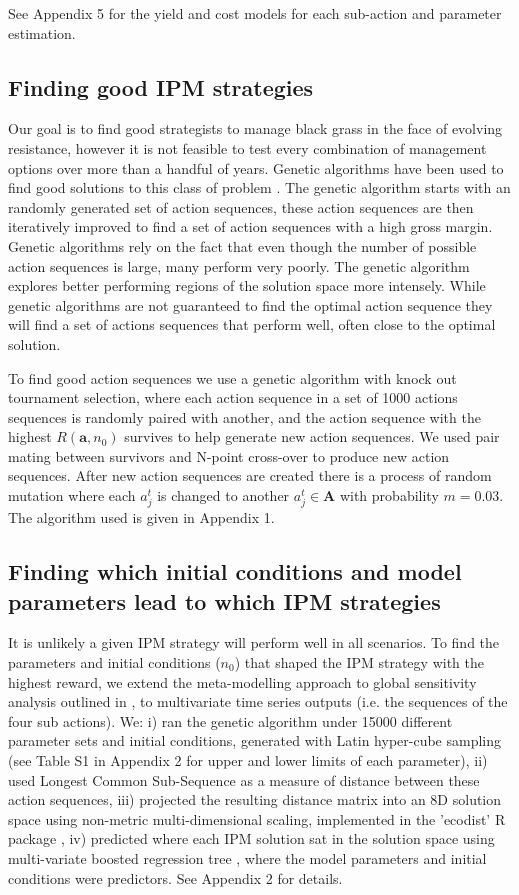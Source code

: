 \documentclass[12pt, a4paper]{article}
\begin{document}
See Appendix 5 for the yield and cost models for each sub-action and parameter estimation.

\subsection*{Finding good IPM strategies} 
Our goal is to find good strategists to manage black grass in the face of evolving resistance, however it is not feasible to test every combination of management options over more than a handful of years. Genetic algorithms have been used to find good solutions to this class of problem \citep{Tayl2004GA, Carr2010}. The genetic algorithm starts with an randomly generated set of action sequences, these action sequences are then iteratively improved to find a set of action sequences with a high gross margin. Genetic algorithms rely on the fact that even though the number of possible action sequences is large, many perform very poorly. The genetic algorithm explores better performing regions of the solution space more intensely. While genetic algorithms are not guaranteed to find the optimal action sequence they will find a set of actions sequences that perform well, often close to the optimal solution.   

To find good action sequences we use a genetic algorithm with knock out tournament selection, where each action sequence in a set of 1000 actions sequences is randomly paired with another, and the action sequence with the highest $R(\mathbf{a}, n_0)$ survives to help generate new action sequences. We used pair mating between survivors and N-point cross-over to produce new action sequences. After new action sequences are created there is a process of random mutation where each $a_j^t$ is changed to another $a_j^t \in \mathbf{A}$ with probability $m = 0.03$. The algorithm used is given in Appendix 1.        

\subsection*{Finding which initial conditions and model parameters lead to which IPM strategies}
It is unlikely a given IPM strategy will perform well in all scenarios. To find the parameters and initial conditions ($n_0$) that shaped the IPM strategy with the highest reward, we extend the meta-modelling approach to global sensitivity analysis outlined in \citep{Cout2014}, to multivariate time series outputs (i.e. the sequences of the four sub actions). We: i) ran the genetic algorithm under 15000 different parameter sets and initial conditions, generated with Latin hyper-cube sampling (see Table S1 in Appendix 2 for upper and lower limits of each parameter), ii) used Longest Common Sub-Sequence \citep{Tooh2015} as a measure of distance between these action sequences, iii) projected the resulting distance matrix into an 8D solution space using non-metric multi-dimensional scaling, implemented in the 'ecodist' R package \citep{Gosl2007}, iv) predicted where each IPM solution sat in the solution space using multi-variate boosted regression tree \citep{Mill2016}, where the model parameters and initial conditions were predictors. See Appendix 2 for details.
\end{document}
